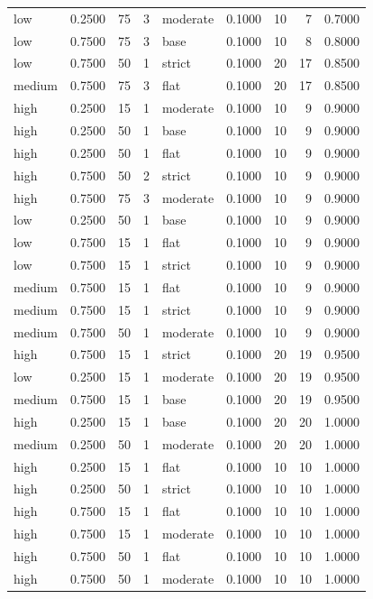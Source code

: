 \begin{tabular}{lrrrlrrrr}
low & 0.2500 & 75 & 3 & moderate & 0.1000 & 10 & 7 & 0.7000 \\
low & 0.7500 & 75 & 3 & base & 0.1000 & 10 & 8 & 0.8000 \\
low & 0.7500 & 50 & 1 & strict & 0.1000 & 20 & 17 & 0.8500 \\
medium & 0.7500 & 75 & 3 & flat & 0.1000 & 20 & 17 & 0.8500 \\
high & 0.2500 & 15 & 1 & moderate & 0.1000 & 10 & 9 & 0.9000 \\
high & 0.2500 & 50 & 1 & base & 0.1000 & 10 & 9 & 0.9000 \\
high & 0.2500 & 50 & 1 & flat & 0.1000 & 10 & 9 & 0.9000 \\
high & 0.7500 & 50 & 2 & strict & 0.1000 & 10 & 9 & 0.9000 \\
high & 0.7500 & 75 & 3 & moderate & 0.1000 & 10 & 9 & 0.9000 \\
low & 0.2500 & 50 & 1 & base & 0.1000 & 10 & 9 & 0.9000 \\
low & 0.7500 & 15 & 1 & flat & 0.1000 & 10 & 9 & 0.9000 \\
low & 0.7500 & 15 & 1 & strict & 0.1000 & 10 & 9 & 0.9000 \\
medium & 0.7500 & 15 & 1 & flat & 0.1000 & 10 & 9 & 0.9000 \\
medium & 0.7500 & 15 & 1 & strict & 0.1000 & 10 & 9 & 0.9000 \\
medium & 0.7500 & 50 & 1 & moderate & 0.1000 & 10 & 9 & 0.9000 \\
high & 0.7500 & 15 & 1 & strict & 0.1000 & 20 & 19 & 0.9500 \\
low & 0.2500 & 15 & 1 & moderate & 0.1000 & 20 & 19 & 0.9500 \\
medium & 0.7500 & 15 & 1 & base & 0.1000 & 20 & 19 & 0.9500 \\
high & 0.2500 & 15 & 1 & base & 0.1000 & 20 & 20 & 1.0000 \\
medium & 0.2500 & 50 & 1 & moderate & 0.1000 & 20 & 20 & 1.0000 \\
high & 0.2500 & 15 & 1 & flat & 0.1000 & 10 & 10 & 1.0000 \\
high & 0.2500 & 50 & 1 & strict & 0.1000 & 10 & 10 & 1.0000 \\
high & 0.7500 & 15 & 1 & flat & 0.1000 & 10 & 10 & 1.0000 \\
high & 0.7500 & 15 & 1 & moderate & 0.1000 & 10 & 10 & 1.0000 \\
high & 0.7500 & 50 & 1 & flat & 0.1000 & 10 & 10 & 1.0000 \\
high & 0.7500 & 50 & 1 & moderate & 0.1000 & 10 & 10 & 1.0000 \\

\end{tabular}
